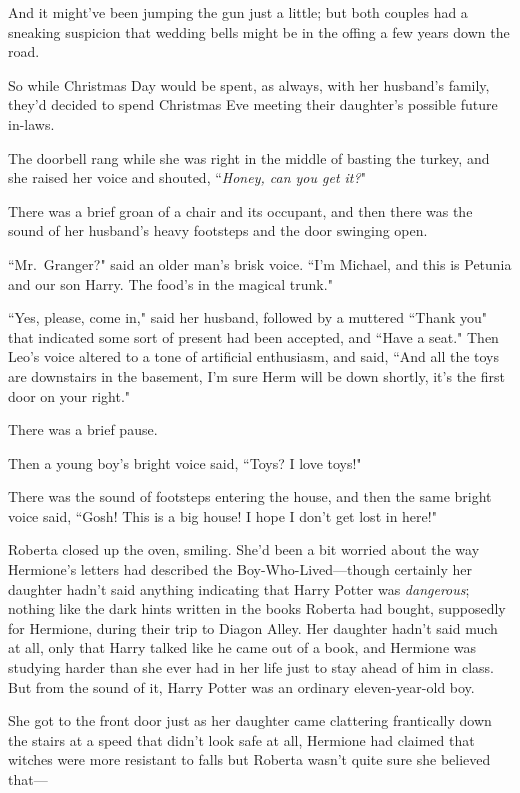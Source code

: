 And it might've been jumping the gun just a little; but both couples had a sneaking suspicion that wedding bells might be in the offing a few years down the road.

So while Christmas Day would be spent, as always, with her husband's family, they'd decided to spend Christmas Eve meeting their daughter's possible future in-laws.

The doorbell rang while she was right in the middle of basting the turkey, and she raised her voice and shouted, ``\emph{Honey, can you get it?}"

There was a brief groan of a chair and its occupant, and then there was the sound of her husband's heavy footsteps and the door swinging open.

``Mr.~Granger?" said an older man's brisk voice. ``I'm Michael, and this is Petunia and our son Harry. The food's in the magical trunk."

``Yes, please, come in," said her husband, followed by a muttered ``Thank you" that indicated some sort of present had been accepted, and ``Have a seat." Then Leo's voice altered to a tone of artificial enthusiasm, and said, ``And all the toys are downstairs in the basement, I'm sure Herm will be down shortly, it's the first door on your right."

There was a brief pause.

Then a young boy's bright voice said, ``Toys? I love toys!"

There was the sound of footsteps entering the house, and then the same bright voice said, ``Gosh! This is a big house! I hope I don't get lost in here!"

Roberta closed up the oven, smiling. She'd been a bit worried about the way Hermione's letters had described the Boy-Who-Lived—though certainly her daughter hadn't said anything indicating that Harry Potter was \emph{dangerous}; nothing like the dark hints written in the books Roberta had bought, supposedly for Hermione, during their trip to Diagon Alley. Her daughter hadn't said much at all, only that Harry talked like he came out of a book, and Hermione was studying harder than she ever had in her life just to stay ahead of him in class. But from the sound of it, Harry Potter was an ordinary eleven-year-old boy.

She got to the front door just as her daughter came clattering frantically down the stairs at a speed that didn't look safe at all, Hermione had claimed that witches were more resistant to falls but Roberta wasn't quite sure she believed that—

